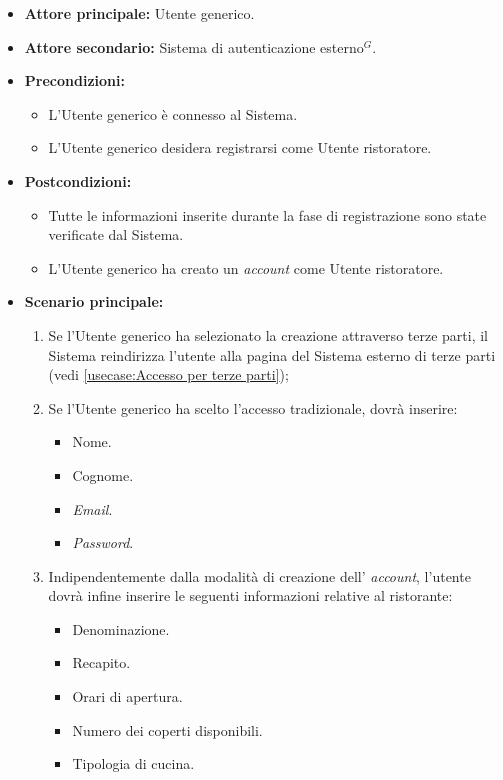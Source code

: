 \label{usecase:Registrazione Utente ristoratore}
\begin{itemize}

	\item \textbf{Attore principale:} Utente generico.
	\item \textbf{Attore secondario:} Sistema di autenticazione esterno$^G$. 

	\item \textbf{Precondizioni:} 
	\begin{itemize}
        \item  L'Utente generico è connesso al Sistema.
        \item  L'Utente generico desidera registrarsi come Utente ristoratore.
    \end{itemize}
    

	\item \textbf{Postcondizioni:} 
    \begin{itemize}
        \item  Tutte le informazioni inserite durante la fase di registrazione sono state verificate dal Sistema.
        \item  L'Utente generico ha creato un \textit{account} come Utente ristoratore.
    \end{itemize}

	\item \textbf{Scenario principale:}
	\begin{enumerate}

            \item Se l'Utente generico ha selezionato la creazione attraverso terze parti, il Sistema reindirizza l'utente alla pagina del Sistema esterno di terze parti (vedi \autoref{usecase:Accesso per terze parti});
            \item Se l'Utente generico ha scelto l'accesso tradizionale, dovrà inserire:
            \begin{itemize}
                \item Nome.
                \item Cognome.
                \item \textit{Email}.
                \item \textit{Password}.
            \end{itemize}

            \item Indipendentemente dalla modalità di creazione dell' \textit{account}, l'utente dovrà infine inserire le seguenti informazioni relative al ristorante:
                \begin{itemize}
                    \item Denominazione.
                    \item Recapito.
                    \item Orari di apertura.
                    \item Numero dei coperti disponibili.
                    \item Tipologia di cucina.
                \end{itemize}
	\end{enumerate}
	
\end{itemize}
